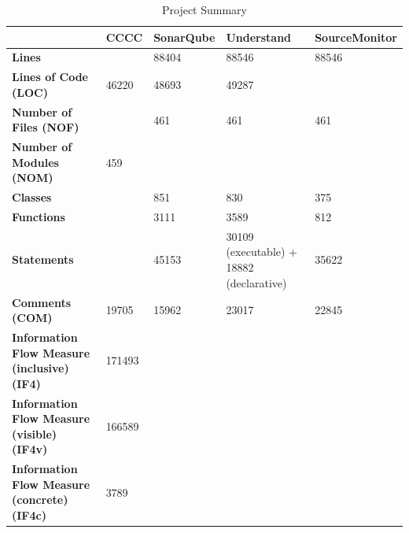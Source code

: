 \begin{table}[]
\centering
\caption{Project Summary}
\label{tab:projectsummary}
\begin{tabular}{|l|l|l|l|l|}
\hline
                                                    & \textbf{CCCC} & \textbf{SonarQube} & \textbf{Understand}                      & \textbf{SourceMonitor} \\ \hline
\textbf{Lines}                                      &               & 88404              & 88546                                    & 88546                  \\ \hline
\textbf{Lines of Code (LOC)}                        & 46220         & 48693              & 49287                                    &                        \\ \hline
\textbf{Number of Files (NOF)}                      &               & 461                & 461                                      & 461                    \\ \hline
\textbf{Number of Modules (NOM)}                    & 459           &                    &                                          &                        \\ \hline
\textbf{Classes}                                    &               & 851                & 830                                      & 375                    \\ \hline
\textbf{Functions}                                  &               & 3111               & 3589                                     & 812                    \\ \hline
\textbf{Statements}                                 &               & 45153              & 30109 (executable) + 18882 (declarative) & 35622                  \\ \hline
\textbf{Comments (COM)}                             & 19705         & 15962              & 23017                                    & 22845                  \\ \hline
\textbf{Information Flow Measure (inclusive) (IF4)} & 171493        &                    &                                          &                        \\ \hline
\textbf{Information Flow Measure (visible) (IF4v)}  & 166589        &                    &                                          &                        \\ \hline
\textbf{Information Flow Measure (concrete) (IF4c)} & 3789          &                    &                                          &                        \\ \hline
\end{tabular}
\end{table}


